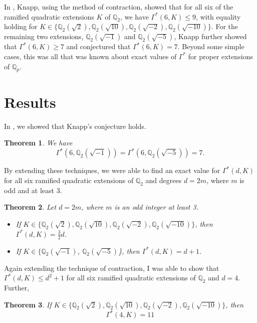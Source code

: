 \documentclass{article}
\newtheorem{theorem}{Theorem}
\begin{document}
In \cite{knapp2016solubility}, Knapp, using the method of contraction, showed that for all six of the ramified quadratic extensions $K$ of $\mathbb{Q}_2$, we have $\Gamma^*(6,K) \le 9$, with equality holding for $K \in \{\mathbb{Q}_2(\sqrt{2}), \mathbb{Q}_2(\sqrt{10}), \mathbb{Q}_2(\sqrt{-2}), \mathbb{Q}_2(\sqrt{-10})\}$.  For the remaining two extensions, $\mathbb{Q}_2(\sqrt{-1})$ and $\mathbb{Q}_2(\sqrt{-5})$, Knapp further showed that $\Gamma^*(6,K) \ge 7$ and conjectured that $\Gamma^*(6,K) = 7$.  Beyond some simple cases, this was all that was known about exact values of $\Gamma^*$ for proper extensions of $\mathbb{Q}_p$.

\section{Results}

In \cite{2020arXiv200509770D}, we showed that Knapp's conjecture holds.

\begin{theorem}
We have $$\Gamma^*(6, \mathbb{Q}_2(\sqrt{-1})) = \Gamma^*(6, \mathbb{Q}_2(\sqrt{-5})) = 7. $$
\end{theorem}

By extending these techniques, we were able to find an exact value for $\Gamma^*(d,K)$ for all six ramified quadratic extensions of $\mathbb{Q}_2$ and degrees $d=2m$, where $m$ is odd and at least 3. \cite{2020arXiv201006833D}

\begin{theorem} \label{theo}
Let $d=2m$, where $m$ is an odd integer at least 3.
\begin{itemize}
    \item If $K \in \{\mathbb{Q}_2(\sqrt{2}), \mathbb{Q}_2(\sqrt{10}), \mathbb{Q}_2(\sqrt{-2}), \mathbb{Q}_2(\sqrt{-10})\}$, then $\Gamma^*(d,K) = \frac{3}{2}d$.
    \item If $K \in  \{\mathbb{Q}_2(\sqrt{-1})$, $\mathbb{Q}_2(\sqrt{-5})$\}, then $\Gamma^*(d,K) = d+1$.
\end{itemize}
\end{theorem}

Again extending the technique of contraction, I was able to show \cite{quarticforms} that $\Gamma^*(d,K) \le d^2 + 1$ for all six ramified quadratic extensions of $\mathbb{Q}_2$ and $d=4$.  Further,

\begin{theorem}
If $K \in \{\mathbb{Q}_2(\sqrt{2}), \mathbb{Q}_2(\sqrt{10}), \mathbb{Q}_2(\sqrt{-2}), \mathbb{Q}_2(\sqrt{-10})\}$, then  $$\Gamma^*(4, K) = 11$$
\end{theorem}
\end{document}

